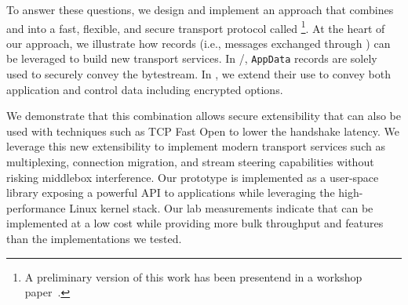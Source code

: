 To answer these questions, we design and implement an approach that combines
\tcp and  into a fast, flexible, and secure transport protocol called \textbf{\tcpls}
%
\footnote{A preliminary version of this work has been presentend in a workshop
  paper~\cite{rochet2020tcpls}.}.  At the heart of our approach, we illustrate
how \tls records (i.e., messages exchanged through \tls) can be leveraged to 
build new transport services. In \tcp/\tls, \tls \texttt{AppData} records are 
solely used to securely convey the \tcp bytestream. In \tcpls, we extend their 
use to convey both application and control data including encrypted \tcp 
options.

We demonstrate that this combination allows secure extensibility that can also
be used with techniques such as TCP Fast Open \cite{rfc7413} to lower the
handshake latency. We leverage this new extensibility to implement modern transport
services such as multiplexing, connection migration, and stream steering capabilities
without risking middlebox interference. Our \tcpls prototype is implemented as a
user-space library exposing a powerful API to applications %
while leveraging the
high-performance Linux kernel \tcp stack. Our lab measurements indicate that
\tcpls can be implemented at a low cost while providing more bulk throughput and
features than the \quic implementations we tested.


